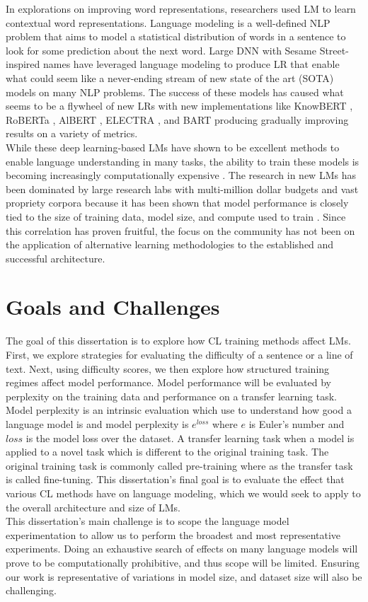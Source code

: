 In explorations on improving word representations, researchers used LM to learn contextual word representations. Language modeling is a well-defined NLP problem that aims to model a statistical distribution of words in a sentence to look for some prediction about the next word. Large DNN with Sesame Street-inspired names \cite{Peters2019KnowledgeEC} \cite{Devlin2019BERTPO} \cite{Sun2019ERNIEER} have leveraged language modeling to produce LR that enable what could seem like a never-ending stream of new state of the art (SOTA) models on many NLP problems. The success of these models has caused what seems to be a flywheel of new LRs with new implementations like KnowBERT \cite{Peters2019KnowledgeEC}, RoBERTa \cite{Liu2019RoBERTaAR}, AlBERT \cite{Lan2019ALBERTAL}, ELECTRA \cite{Clark2020ELECTRAPT}, and BART \cite{Lewis2019BARTDS} producing gradually improving results on a variety of metrics. \\
While these deep learning-based LMs have shown to be excellent methods to enable language understanding in many tasks, the ability to train these models is becoming increasingly computationally expensive \cite{Strubell2019EnergyAP}. The research in new LMs has been dominated by large research labs with multi-million dollar budgets and vast propriety corpora because it has been shown that model performance is closely tied to the size of training data, model size, and compute used to train \cite{Kaplan2020ScalingLF}. Since this correlation has proven fruitful, the focus on the community has not been on the application of alternative learning methodologies to the established and successful architecture.
\section {Goals and Challenges}
\label{chap:intro:sec:goals}
The goal of this dissertation is to explore how CL training methods affect LMs. First, we explore strategies for evaluating the difficulty of a sentence or a line of text. Next, using difficulty scores, we then explore how structured training regimes affect model performance. Model performance will be evaluated by perplexity on the training data and performance on a transfer learning task. Model perplexity is an intrinsic evaluation which use to understand how good a language model is and model perplexity is $e^{loss}$ where $e$ is Euler's number and $loss$ is the model loss over the dataset. A transfer learning task when a model is applied to a novel task which is different to the original training task. The original training task is commonly called pre-training where as the transfer task is called fine-tuning. This dissertation's final goal is to evaluate the effect that various CL methods have on language modeling, which we would seek to apply to the overall architecture and size of LMs. \\
This dissertation's main challenge is to scope the language model experimentation to allow us to perform the broadest and most representative experiments. Doing an exhaustive search of effects on many language models will prove to be computationally prohibitive, and thus scope will be limited. Ensuring our work is representative of variations in model size, and dataset size will also be challenging. 
